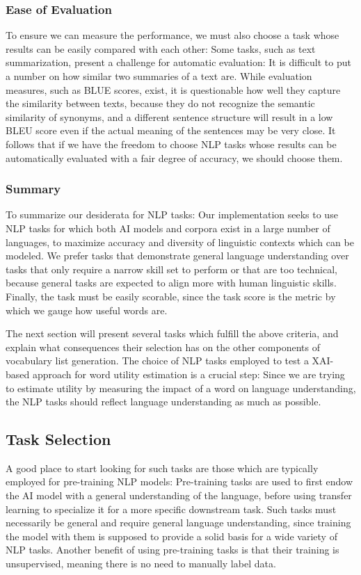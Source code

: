 \subsubsection{Ease of Evaluation}
To ensure we can measure the performance, we must also choose a task whose results can be easily compared with each other:
Some tasks, such as text summarization, present a challenge for automatic evaluation:
It is difficult to put a number on how similar two summaries of a text are.
While evaluation measures, such as BLUE scores, exist, it is questionable how well they capture the similarity between texts, because they do not recognize the semantic similarity of synonyms, and a different sentence structure will result in a low BLEU score even if the actual meaning of the sentences may be very close.
It follows that if we have the freedom to choose NLP tasks whose results can be automatically evaluated with a fair degree of accuracy, we should choose them.


\subsubsection{Summary}
To summarize our desiderata for NLP tasks:
Our implementation seeks to use NLP tasks for which both AI models and corpora exist in a large number of languages, to maximize accuracy and diversity of linguistic contexts which can be modeled.
We prefer tasks that demonstrate general language understanding over tasks that only require a narrow skill set to perform or that are too technical, because general tasks are expected to align more with human linguistic skills.
Finally, the task must be easily scorable, since the task score is the metric by which we gauge how useful words are.

The next section will present several tasks which fulfill the above criteria, and explain what consequences their selection has on the other components of vocabulary list generation.
The choice of NLP tasks employed to test a XAI-based approach for word utility estimation is a crucial step:
Since we are trying to estimate utility by measuring the impact of a word on language understanding, the NLP tasks should reflect language understanding as much as possible.

\subsection{Task Selection} \label{sec:nlp-tasks-selection}
A good place to start looking for such tasks are those which are typically employed for pre-training NLP models:
Pre-training tasks are used to first endow the AI model with a general understanding of the language, before using transfer learning to specialize it for a more specific downstream task.
Such tasks must necessarily be general and require general language understanding, since training the model with them is supposed to provide a solid basis for a wide variety of NLP tasks.
Another benefit of using pre-training tasks is that their training is unsupervised, meaning there is no need to manually label data.

